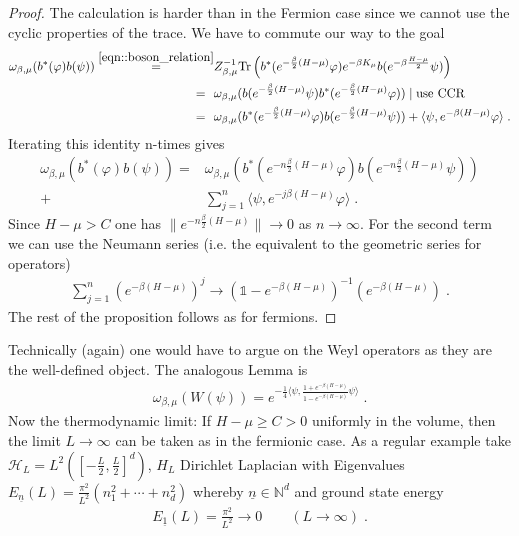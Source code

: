 \documentclass[
a4paper, %
11pt, %
onecolumn, %
openany, %
]{memoir}
\theoremstyle{definition}
\theoremstyle{remark}
\theoremstyle{plain}
\begin{document}
\begin{proof}
	The calculation is harder than in the Fermion case since we cannot use the cyclic properties of the trace. We have to commute our way to the goal \begin{align}
	\omega_{\beta,\mu}(b^*(\varphi)b(\psi))\overset{\eqref{eqn::boson_relation}}{=}&Z_{\beta,\mu}^{-1}\mathrm{Tr}\left(b^*(e^{-\frac{\beta}{2}(H-\mu)}\varphi)e^{-\beta K_{\mu}}b(e^{-\beta \frac{H-\mu}{2}}\psi)\right)\\
	=~~&\omega_{\beta,\mu}(b(e^{-\frac{\beta}{2}(H-\mu)}\psi)b^*(e^{-\frac{\beta}{2}(H-\mu)}\varphi))\mid \text{use CCR}\\
	=~~&\omega_{\beta,\mu}(b^*(e^{-\frac{\beta}{2}(H-\mu)}\varphi)b(e^{-\frac{\beta}{2}(H-\mu)}\psi))+\langle \psi, e^{-\beta (H-\mu)} \varphi\rangle\; .	\end{align}
	Iterating this identity n-times gives \begin{align}
	\omega_{\beta,\mu}(b^*(\varphi)b(\psi))=&\omega_{\beta,\mu}\left(b^*(e^{-n\frac{\beta}{2}(H-\mu)}\varphi)b(e^{-n\frac{\beta}{2}(H-\mu)}\psi)\right)\\
	+&\sum_{j=1}^{n}\langle \psi, e^{-j\beta(H-\mu)}\varphi\rangle\; .
	\end{align}
	Since $H-\mu > C$ one has $\|e^{-n\frac{\beta}{2}(H-\mu)}\|\rightarrow 0$ as $n\rightarrow\infty$. For the second term we can use the Neumann series (i.e. the equivalent to the geometric series for operators) \begin{align}
	\sum_{j=1}^n\left(e^{-\beta(H-\mu)}\right)^j\rightarrow \left(\mathds{1}-e^{-\beta(H-\mu)}\right)^{-1}\left(e^{-\beta(H-\mu)}\right)\; .
	\end{align}
	The rest of the proposition follows as for fermions. 
	\end{proof}
	Technically (again) one would have to argue on the Weyl operators as they are the well-defined object. The analogous Lemma is \begin{align}
	\omega_{\beta,\mu}(W(\psi))=e^{-\frac{1}{4}\langle\psi, \frac{1+e^{-\beta(H-\mu)}}{1-e^{-\beta(H-\mu)}}\psi\rangle}\; .
	\end{align}
	Now the thermodynamic limit: If $H-\mu\geq C > 0$ uniformly in the volume, then the limit $L\rightarrow \infty$ can be taken as in the fermionic case. As a regular example take $\mathcal{H}_L=L^2\left(\left[-\frac{L}{2},\frac{L}{2}\right]^d\right)$, $H_L$ Dirichlet Laplacian with Eigenvalues $E_{\underline{n}}(L)=\frac{\pi^2}{L^2}(n_1^2+\cdots+n_d^2)$ whereby $\underline{n}\in \mathbb{N}^d$ and ground state energy \begin{align}
	E_{\underline{1}}(L)=\frac{\pi^2}{L^2}\rightarrow 0 \qquad (L\rightarrow \infty)\; .
	\end{align}
\end{document}
